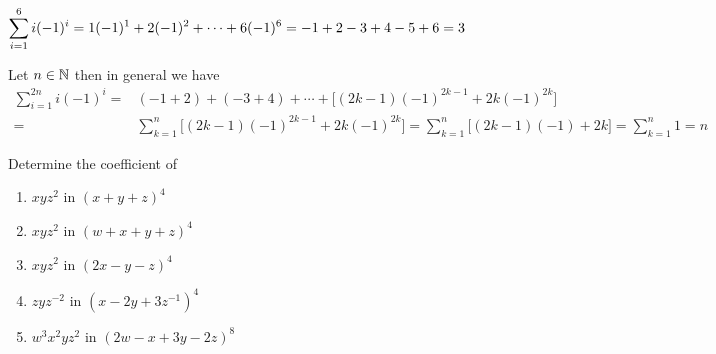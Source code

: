 \documentclass[a4paper, english, 12pt]{article} %
\begin{document}
\begin{subproblem}
  $\displaystyle \sum_{i = 1}^{6} i(-1)^i \ans{= 1(-1)^1 + 2(-1)^2 + \cdots + 
    6(-1)^6 = -1 + 2 - 3 + 4 - 5 + 6 = 3}$
\end{subproblem}

\begin{answer}
  Let $n \in \mathbb{N}$ then in general we have
  \begin{align*}
         \sum_{i = 1}^{2n} i(-1)^i
     = & (-1 + 2) + (-3 + 4) + \cdots + \bigl[  (2k - 1) (-1)^{2k-1} + 2k(-1)^{2k}\bigr] \\
     = & \sum_{k = 1}^{n} \bigr[ (2k-1)(-1)^{2k-1} + 2k(-1)^{2k}\bigl] 
     =   \sum_{k = 1}^{n} \bigr[ (2k - 1)(-1) + 2k \bigl] 
      =  \sum_{k = 1}^n 1
      = n
  \end{align*}
\end{answer}

\begin{problem}[25]
  Determine the coefficient of
  \begin{enumerate}[label = \textbf{\alph*)} ]
    \item $xyz^2$ in $(x + y + z)^4$
    \item $xyz^2$ in $(w + x + y+ z)^4$
    \item $xyz^2$ in $(2x - y - z)^4$
    \item $zyz^{-2}$ in $(x - 2y + 3z^{-1})^4$
    \item $w^3x^2yz^2$ in $(2w - x + 3y - 2z)^{8}$
  \end{enumerate} 
\end{problem}
\end{document}

